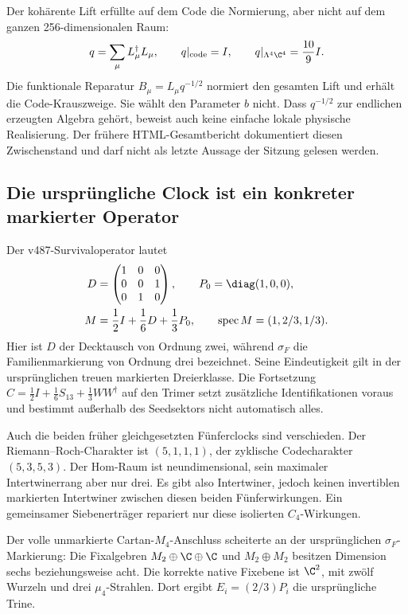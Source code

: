 Der kohärente Lift erfüllte auf dem Code die Normierung, aber nicht auf dem ganzen 256-dimensionalen Raum:
\begin{equation}
q=\sum_\mu L_\mu^\dagger L_\mu,\qquad
q|_{\rm code}=I,\qquad q|_{\Lambda^4\C^4}=\frac{10}{9}I.
\end{equation}
Die funktionale Reparatur $B_\mu=L_\mu q^{-1/2}$ normiert den gesamten Lift und erhält die Code-Krauszweige. Sie wählt den Parameter $b$ nicht. Dass $q^{-1/2}$ zur endlichen erzeugten Algebra gehört, beweist auch keine einfache lokale physische Realisierung. Der frühere HTML-Gesamtbericht dokumentiert diesen Zwischenstand und darf nicht als letzte Aussage der Sitzung gelesen werden.

\subsection{Die ursprüngliche Clock ist ein konkreter markierter Operator}
Der v487-Survivaloperator lautet
\begin{align}
D&=\begin{pmatrix}1&0&0\\0&0&1\\0&1&0\end{pmatrix},\qquad P_0=\diag(1,0,0),\\
M&=\frac12I+\frac16D+\frac13P_0,\qquad \operatorname{spec}M=(1,2/3,1/3).
\end{align}
Hier ist $D$ der Decktausch von Ordnung zwei, während $\sigma_F$ die Familienmarkierung von Ordnung drei bezeichnet. Seine Eindeutigkeit gilt in der ursprünglichen treuen markierten Dreierklasse. Die Fortsetzung
$C=\frac12I+\frac16S_{13}+\frac13WW^\dagger$ auf den Trimer setzt zusätzliche Identifikationen voraus und bestimmt außerhalb des Seedsektors nicht automatisch alles.

Auch die beiden früher gleichgesetzten Fünferclocks sind verschieden. Der Riemann--Roch-Charakter ist $(5,1,1,1)$, der zyklische Codecharakter $(5,3,5,3)$. Der Hom-Raum ist neundimensional, sein maximaler Intertwinerrang aber nur drei. Es gibt also Intertwiner, jedoch keinen invertiblen markierten Intertwiner zwischen diesen beiden Fünferwirkungen. Ein gemeinsamer Siebenerträger repariert nur diese isolierten $C_4$-Wirkungen.

Der volle unmarkierte Cartan-$M_4$-Anschluss scheiterte an der ursprünglichen $\sigma_F$-Markierung: Die Fixalgebren $M_2\oplus\C\oplus\C$ und $M_2\oplus M_2$ besitzen Dimension sechs beziehungsweise acht. Die korrekte native Fixebene ist $\C^2$, mit zwölf Wurzeln und drei $\mu_4$-Strahlen. Dort ergibt $E_i=(2/3)P_i$ die ursprüngliche Trine.

